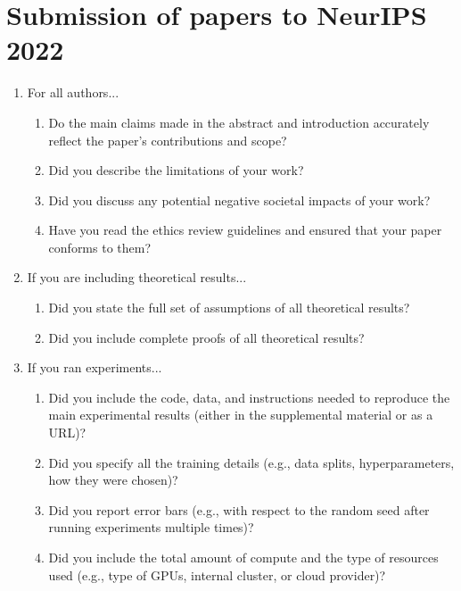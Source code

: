 \documentclass{article}
\begin{document}
\newpage

\section{Submission of papers to NeurIPS 2022}

\begin{enumerate}


\item For all authors...
\begin{enumerate}
  \item Do the main claims made in the abstract and introduction accurately reflect the paper's contributions and scope?
    \answerYes{}
  \item Did you describe the limitations of your work?
  \item Did you discuss any potential negative societal impacts of your work?
  \item Have you read the ethics review guidelines and ensured that your paper conforms to them?
    \answerYes{}
\end{enumerate}


\item If you are including theoretical results...
\begin{enumerate}
\item Did you state the full set of assumptions of all theoretical results?
\item Did you include complete proofs of all theoretical results?
\end{enumerate}


\item If you ran experiments...
\begin{enumerate}
\item Did you include the code, data, and instructions needed to reproduce the main experimental results (either in the supplemental material or as a URL)?
\item Did you specify all the training details (e.g., data splits, hyperparameters, how they were chosen)?
\item Did you report error bars (e.g., with respect to the random seed after running experiments multiple times)?
\item Did you include the total amount of compute and the type of resources used (e.g., type of GPUs, internal cluster, or cloud provider)?
\end{enumerate}



\end{enumerate}
\end{document}
